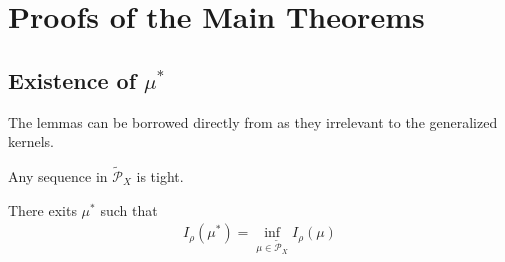 \section{Proofs of the Main Theorems}\label{tsne:sec:proofs}
\subsection{Existence of \texorpdfstring{$\mu^*$}{mu-star}}
The lemmas can be borrowed directly from \cite{auffinger-tsne} as they irrelevant to the generalized kernels.
\begin{lemma}
    Any sequence in $\tilde{\mathcal{P}}_X$ is tight.
\end{lemma}
\begin{lemma} \label{mu_star_lemma}
    There exits $\mu^*$ such that
    \begin{align}
        I_{\rho}(\mu^*) = \inf_{\mu \in \tilde{\mathcal{P}}_X} I_{\rho}(\mu)
    \end{align}
\end{lemma}

